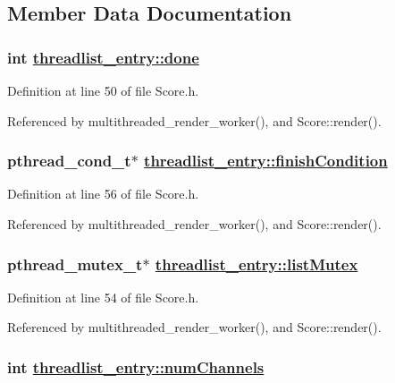 \subsection{Member Data Documentation}
\hypertarget{structthreadlist__entry_o2}{
\subsubsection[done]{\setlength{\rightskip}{0pt plus 5cm}int \hyperlink{structthreadlist__entry_o2}{threadlist\_\-entry::done}}}
\label{structthreadlist__entry_o2}




Definition at line 50 of file Score.h.

Referenced by multithreaded\_\-render\_\-worker(), and Score::render().\hypertarget{structthreadlist__entry_o5}{
\subsubsection[finishCondition]{\setlength{\rightskip}{0pt plus 5cm}pthread\_\-cond\_\-t$\ast$ \hyperlink{structthreadlist__entry_o5}{threadlist\_\-entry::finish\-Condition}}}
\label{structthreadlist__entry_o5}




Definition at line 56 of file Score.h.

Referenced by multithreaded\_\-render\_\-worker(), and Score::render().\hypertarget{structthreadlist__entry_o4}{
\subsubsection[listMutex]{\setlength{\rightskip}{0pt plus 5cm}pthread\_\-mutex\_\-t$\ast$ \hyperlink{structthreadlist__entry_o4}{threadlist\_\-entry::list\-Mutex}}}
\label{structthreadlist__entry_o4}




Definition at line 54 of file Score.h.

Referenced by multithreaded\_\-render\_\-worker(), and Score::render().\hypertarget{structthreadlist__entry_o6}{
\subsubsection[numChannels]{\setlength{\rightskip}{0pt plus 5cm}int \hyperlink{structthreadlist__entry_o6}{threadlist\_\-entry::num\-Channels}}}
\label{structthreadlist__entry_o6}




